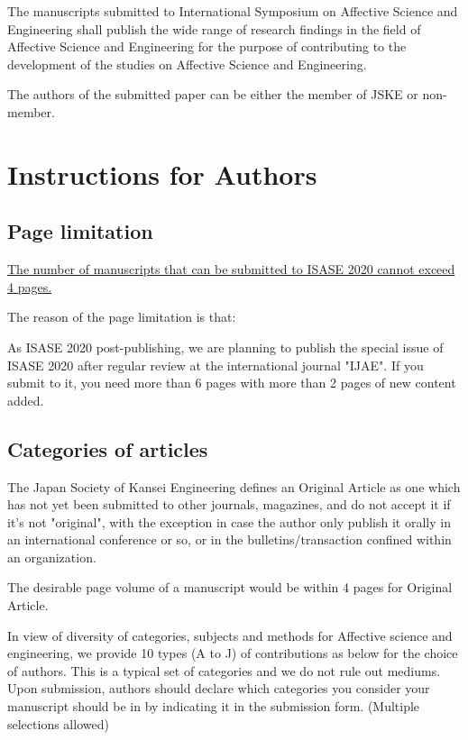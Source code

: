 \documentclass[a4paper,10pt,conference,compsoc]{ISASE}
\begin{document}
The manuscripts submitted to International Symposium on Affective Science and
Engineering shall publish the wide range of research findings in the field of
Affective Science and Engineering for the purpose of contributing to the
development of the studies on Affective Science and Engineering.

The authors of the submitted paper can be either the member of JSKE or
non-member.

\section{Instructions for Authors}

\subsection{Page limitation}

\uline{The number of manuscripts that can be submitted to ISASE 2020 cannot
exceed 4 pages.}

The reason of the page limitation is that:

As ISASE 2020 post-publishing, we are planning to publish the special issue of
ISASE 2020 after regular review at the international journal "IJAE". If you
submit to it, you need more than 6 pages with more than 2 pages of new content
added.

\subsection{Categories of articles}

The Japan Society of Kansei Engineering defines an Original Article as one
which has not yet been submitted to other journals, magazines, and do not
accept it if it's not "original", with the exception in case the author only
publish it orally in an international conference or so, or in the
bulletins/transaction confined within an organization.

The desirable page volume of a manuscript would be within 4 pages for Original
Article.

In view of diversity of categories, subjects and methods for Affective science
and engineering, we provide 10 types (A to J) of contributions as below for the
choice of authors. This is a typical set of categories and we do not rule out
mediums. Upon submission, authors should declare which categories you consider
your manuscript should be in by indicating it in the submission form. (Multiple
selections allowed)
\end{document}
